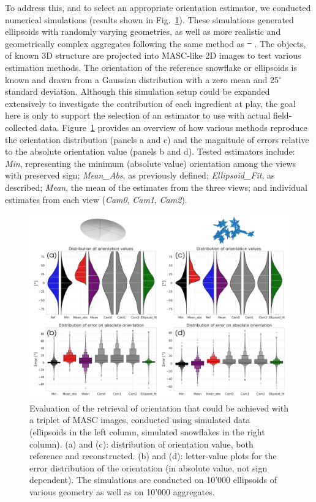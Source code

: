 \documentclass[draft]{agujournal2019}
\providecommand{\DIFadd}[1]{{\protect\color{blue}\uwave{#1}}} %
\providecommand{\DIFdel}[1]{{\protect\color{red}\sout{#1}}}                      %
\providecommand{\DIFaddbegin}{} %
\providecommand{\DIFaddend}{} %
\providecommand{\DIFdelbegin}{} %
\providecommand{\DIFdelend}{} %
\begin{document}
To address this, and to select an appropriate orientation estimator, we conducted numerical simulations (results shown in Fig.~\ref{fig:simulations}). These simulations generated ellipsoids with randomly varying geometries, as well as more realistic and geometrically complex aggregates following the same method as \DIFdelbegin \DIFdel{\mbox{%
\cite{Leinonen_AMT_2021}}\hspace{0pt}%
}\DIFdelend \DIFaddbegin \DIFadd{\mbox{%
\citeA{Leinonen_AMT_2021}}\hspace{0pt}%
}\DIFaddend . The objects, of known 3D structure are projected into MASC-like 2D images to test various estimation methods. The orientation of the reference snowflake or ellipsoids is known and drawn from a Gaussian distribution with a zero mean and 25$^\circ$ standard deviation. Although this simulation setup could be expanded extensively to investigate the contribution of each ingredient at play, the goal here is only to support the selection of an estimator to use with actual field-collected data. Figure~\ref{fig:simulations} provides an overview of how various methods reproduce the orientation distribution (panels a and c) and the magnitude of errors relative to the absolute orientation value (panels b and d). Tested estimators include: \textit{Min}, representing the minimum (absolute value) orientation among the views with preserved sign; \textit{Mean\_Abs}, as previously defined; \textit{Ellipsoid\_Fit}, as described; \textit{Mean}, the mean of the estimates from the three views; and individual estimates from each view (\textit{Cam0}, \textit{Cam1}, \textit{Cam2}).

\begin{figure}
 \noindent \centering \includegraphics[width=\textwidth]{Fig02.png}
\caption{Evaluation of the retrieval of orientation that could be achieved with a triplet of MASC images, conducted using simulated data (ellipsoids in the left column, simulated snowflakes in the right column). (a) and (c): distribution of orientation value, both reference and reconstructed. (b) and (d): letter-value plots for the  error distribution of the orientation (in absolute value, not sign dependent). The simulations are conducted on 10'000 ellipsoids of various geometry as well as on 10'000 aggregates. }
\label{fig:simulations}
\end{figure}
\end{document}
